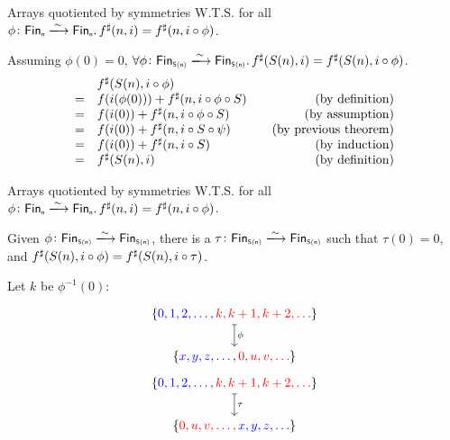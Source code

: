 \documentclass[9pt]{beamer}
\begin{document}
\begin{frame}[fragile]{Arrays quotiented by symmetries}
    W.T.S. for all $\phi\colon \Fin[n]\xto{\sim}\Fin[n]. \, \ext{f}(n, i) = \ext{f}(n, i \circ \phi)$.

    \begin{tblock}
    Assuming $\phi(0) = 0$, $\forall \phi\colon \Fin[S(n)]\xto{\sim}\Fin[S(n)]. \, \ext{f}(S(n), i) = \ext{f}(S(n), i \circ \phi)$.
    \[\begin{array}{rlr}
        & {f}^{\sharp}(S(n), i \circ \phi) & \\
        =& f(i(\phi(0))) + {f}^{\sharp}(n, i \circ \phi \circ S) & \quad\text{(by definition)} \\
        =& f(i(0)) + {f}^{\sharp}(n, i \circ \phi \circ S)       & \quad\text{(by assumption)} \\
        =& f(i(0)) + {f}^{\sharp}(n, i \circ S \circ \psi)       & \quad\text{(by previous theorem)} \\
        =& f(i(0)) + {f}^{\sharp}(n, i \circ S)                  & \quad\text{(by induction)} \\
        =& {f}^{\sharp}(S(n), i)                                 & \quad\text{(by definition)} \\
    \end{array}\]
    \end{tblock}
    
\end{frame}

\begin{frame}[fragile]{Arrays quotiented by symmetries}
    W.T.S. for all $\phi\colon \Fin[n]\xto{\sim}\Fin[n]. \, \ext{f}(n, i) = \ext{f}(n, i \circ \phi)$.

    \begin{tblock}
    Given $\phi\colon \Fin[S(n)]\xto{\sim}\Fin[S(n)]$, there is a $\tau\colon \Fin[S(n)]\xto{\sim}\Fin[S(n)]$
    such that $\tau(0) = 0$, and ${f}^{\sharp}(S(n), i \circ \phi) = {f}^{\sharp}(S(n), i \circ \tau)$.

    Let $k$ be $\phi^{-1}(0)$:

    \[\begin{tikzcd}[ampersand replacement=\&,cramped]
    	{\{\color{blue}0, 1, 2, \dots, \color{red}k, k+1, k+2, \dots \color{black}\}} \\
    	{ \{\color{blue}x, y, z, \dots, \color{red}0, u, v, \dots \color{black}\}}
        \arrow["\phi", maps to, from=1-1, to=2-1]
    \end{tikzcd}\]

    \[\begin{tikzcd}[ampersand replacement=\&,cramped]
    	{\{\color{blue}0, 1, 2, \dots, \color{red}k, k+1, k+2, \dots \color{black}\}} \\
    	{ \{\color{red}0, u, v, \dots, \color{blue}x, y, z, \dots \color{black}\}}
        \arrow["\tau", maps to, from=1-1, to=2-1]
    \end{tikzcd}\]
    
    \end{tblock}
    
\end{frame}
\end{document}
